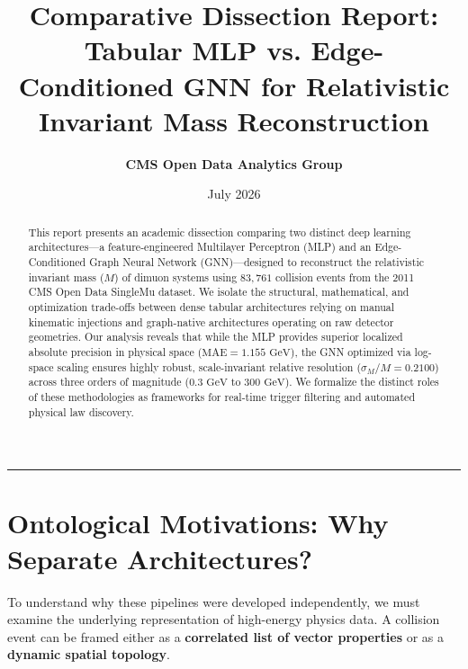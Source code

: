 \documentclass[11pt,a4paper,oneside]{article}
\title{Comparative Dissection Report: Tabular MLP vs. Edge-Conditioned GNN for Relativistic Invariant Mass Reconstruction}
\author{\textbf{CMS Open Data Analytics Group}}
\date{July 2026}
\begin{document}
\pagestyle{empty}

\maketitle
\thispagestyle{empty}

\begin{abstract}
This report presents an academic dissection comparing two distinct deep learning architectures---a feature-engineered Multilayer Perceptron (MLP) and an Edge-Conditioned Graph Neural Network (GNN)---designed to reconstruct the relativistic invariant mass ($M$) of dimuon systems using $83,761$ collision events from the 2011 CMS Open Data SingleMu dataset. We isolate the structural, mathematical, and optimization trade-offs between dense tabular architectures relying on manual kinematic injections and graph-native architectures operating on raw detector geometries. Our analysis reveals that while the MLP provides superior localized absolute precision in physical space ($\text{MAE} = 1.155\text{ GeV}$), the GNN optimized via log-space scaling ensures highly robust, scale-invariant relative resolution ($\sigma_M/M = 0.2100$) across three orders of magnitude ($0.3\text{ GeV}$ to $300\text{ GeV}$). We formalize the distinct roles of these methodologies as frameworks for real-time trigger filtering and automated physical law discovery.
\end{abstract}

\hrule
\vspace{1.5em}

\section{Ontological Motivations: Why Separate Architectures?}

To understand why these pipelines were developed independently, we must examine the underlying representation of high-energy physics data. A collision event can be framed either as a \textbf{correlated list of vector properties} or as a \textbf{dynamic spatial topology}.
\end{document}
